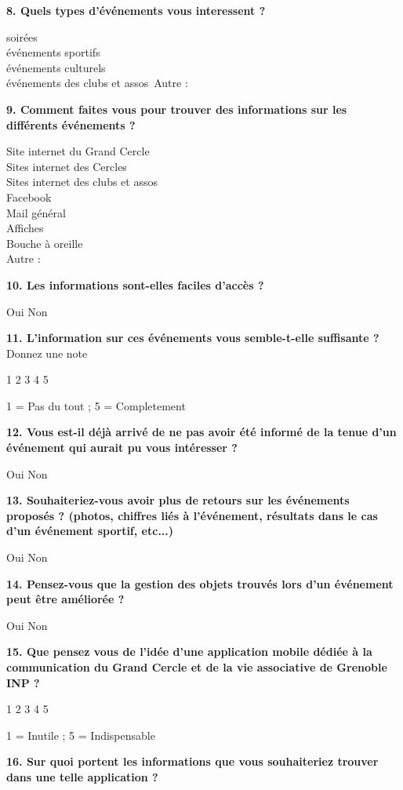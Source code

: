 \documentclass[a4paper, 11px]{article}
\begin{document}
\textbf{8. Quels types d'événements vous interessent ? }

\indent soirées\\
\indent événements sportifs\\
\indent événements culturels\\
\indent événements des clubs et assos\
\indent Autre : 


\textbf{9. Comment faites vous pour trouver des informations sur les différents événements ? }

\indent Site internet du Grand Cercle\\
\indent Sites internet des Cercles\\
\indent Sites internet des clubs et assos\\
\indent Facebook\\
\indent Mail général\\
\indent Affiches\\
\indent Bouche à oreille\\
\indent Autre : 


\textbf{10. Les informations sont-elles faciles d'accès ? }

    Oui
    Non


\textbf{11. L'information sur ces événements vous semble-t-elle suffisante ? } Donnez une note

	1 	2 	3 	4 	5 	

1 = Pas du tout ; 5 = Completement

\textbf{12. Vous est-il déjà arrivé de ne pas avoir été informé de la tenue d'un événement qui aurait pu vous intéresser ? }

    Oui
    Non


\textbf{13. Souhaiteriez-vous avoir plus de retours sur les événements proposés ? (photos, chiffres liés à l'événement, résultats dans le cas d'un événement sportif, etc...)}

    Oui
    Non


\textbf{14. Pensez-vous que la gestion des objets trouvés lors d'un événement peut être améliorée ? }

    Oui
    Non


\textbf{15. Que pensez vous de l'idée d'une application mobile dédiée à la communication du Grand Cercle et de la vie associative de Grenoble INP ?}

	1 	2 	3 	4 	5 	

1 = Inutile ; 5 = Indispensable

\textbf{16. Sur quoi portent les informations que vous souhaiteriez trouver dans une telle application ? }
\end{document}
